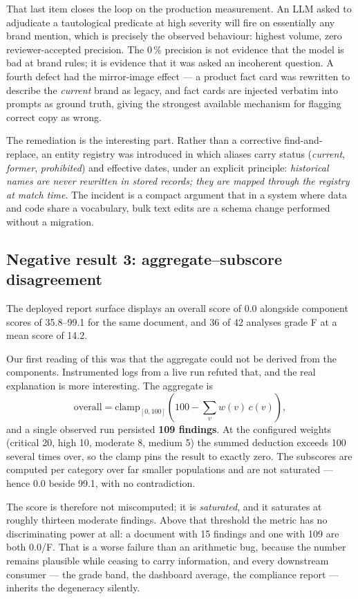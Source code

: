 \documentclass[10pt]{article}
\begin{document}
That last item closes the loop on the production measurement. An LLM asked to
adjudicate a tautological predicate at high severity will fire on essentially
any brand mention, which is precisely the observed behaviour: highest volume,
zero reviewer-accepted precision. The 0\,\% precision is not evidence that the
model is bad at brand rules; it is evidence that it was asked an incoherent
question. A fourth defect had the mirror-image effect --- a product fact card
was rewritten to describe the \emph{current} brand as legacy, and fact cards
are injected verbatim into prompts as ground truth, giving the strongest
available mechanism for flagging correct copy as wrong.

The remediation is the interesting part. Rather than a corrective
find-and-replace, an entity registry was introduced in which aliases carry
status (\textit{current}, \textit{former}, \textit{prohibited}) and effective
dates, under an explicit principle: \emph{historical names are never rewritten
in stored records; they are mapped through the registry at match time}. The
incident is a compact argument that in a system where data and code share a
vocabulary, bulk text edits are a schema change performed without a migration.

\subsection{Negative result 3: aggregate--subscore disagreement}

The deployed report surface displays an overall score of 0.0 alongside
component scores of 35.8--99.1 for the same document, and 36 of 42 analyses
grade F at a mean score of 14.2.

Our first reading of this was that the aggregate could not be derived from the
components. Instrumented logs from a live run refuted that, and the real
explanation is more interesting. The aggregate is
\[
  \text{overall} = \mathrm{clamp}_{[0,100]}\!\left(100 - \sum_v w(v)\,c(v)\right),
\]
and a single observed run persisted \textbf{109 findings}. At the configured
weights (critical 20, high 10, moderate 8, medium 5) the summed deduction
exceeds 100 several times over, so the clamp pins the result to exactly zero.
The subscores are computed per category over far smaller populations and are
not saturated --- hence 0.0 beside 99.1, with no contradiction.

The score is therefore not miscomputed; it is \emph{saturated}, and it
saturates at roughly thirteen moderate findings. Above that threshold the
metric has no discriminating power at all: a document with 15 findings and one
with 109 are both 0.0/F. That is a worse failure than an arithmetic bug,
because the number remains plausible while ceasing to carry information, and
every downstream consumer --- the grade band, the dashboard average, the
compliance report --- inherits the degeneracy silently.
\end{document}
